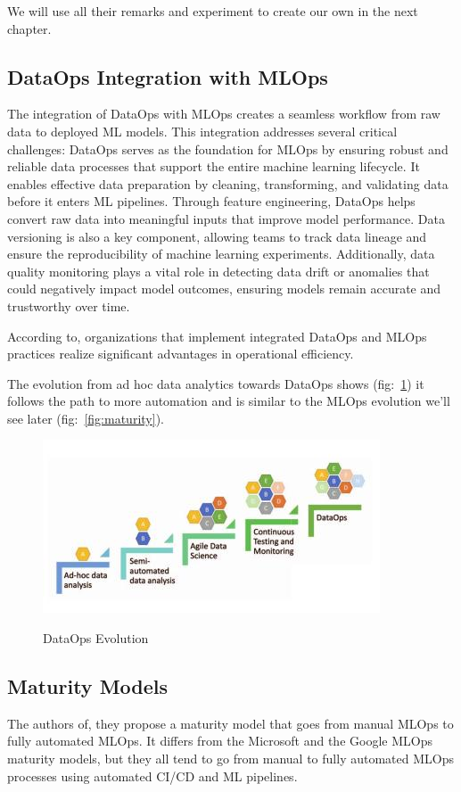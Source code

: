 We will use all their remarks and experiment to create our own in the next chapter.

\subsection{DataOps Integration with MLOps}\label{subsec:dataops-mlops-integration}

The integration of DataOps with MLOps creates a seamless workflow from raw data to deployed ML models.
This integration addresses several critical challenges\cite{ad-hoc-dataops}:
DataOps serves as the foundation for MLOps by ensuring robust and reliable data processes that support the entire machine learning lifecycle.
It enables effective data preparation by cleaning, transforming, and validating data before it enters ML pipelines.
Through feature engineering, DataOps helps convert raw data into meaningful inputs that improve model performance.
Data versioning is also a key component, allowing teams to track data lineage and ensure the reproducibility of machine learning experiments.
Additionally, data quality monitoring plays a vital role in detecting data drift or anomalies that could negatively impact model outcomes, ensuring models remain accurate and trustworthy over time.

According to\cite{dataops-mlops}, organizations that implement integrated DataOps and MLOps practices
realize significant advantages in
operational efficiency.

The evolution from ad hoc data analytics towards DataOps shows (fig:~\ref{fig:dataops-evo}) it follows the path to more automation
and is similar to the MLOps evolution we'll see later (fig:~\ref{fig:maturity}).
\begin{figure}[!htbp]
    \caption{DataOps Evolution\cite{ad-hoc-dataops}}
    \centering
    \includegraphics[scale=0.6]{images/dataops-evo}
    \label{fig:dataops-evo}
\end{figure}

\subsection{Maturity Models}\label{subsec:matutiry-models}
The authors of\cite{mlops-maturity-model}, they propose a maturity model that goes from manual MLOps to fully automated MLOps.
It differs from the Microsoft and the Google MLOps maturity models,
but they all tend to go from manual to fully automated MLOps processes using automated CI/CD and
ML pipelines.\cite{mlops-definition-tools-and-challenge}

